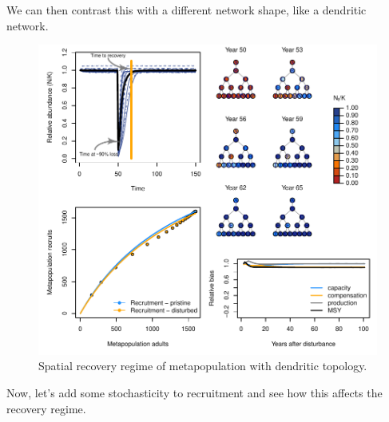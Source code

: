 \documentclass[]{article}
\begin{document}
We can then contrast this with a different network shape, like a
dendritic network.

\begin{figure}[H]

{\centering \includegraphics{Managing_for_ecological_surprises_in_metapopulations_files/figure-latex/example results2-1} 

}

\caption{Spatial recovery regime of metapopulation with dendritic topology.}\label{fig:example results2}
\end{figure}
\newpage

Now, let's add some stochasticity to recruitment and see how this
affects the recovery regime.
\end{document}
